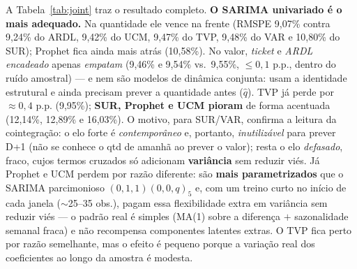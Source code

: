 \documentclass[11pt,a4paper]{article}
\begin{document}
A Tabela~\ref{tab:joint} traz o resultado completo. \textbf{O SARIMA univariado é o mais adequado.}
Na quantidade ele vence na frente (RMSPE 9,07\% contra 9,24\% do ARDL, 9,42\% do UCM, 9,47\% do TVP,
9,48\% do VAR e 10,80\% do SUR); Prophet fica ainda mais atrás (10,58\%). No valor, \emph{ticket} e
\emph{ARDL encadeado} apenas \emph{empatam} (9,46\% e 9,54\% vs.\ 9,55\%, $\le 0{,}1$ p.p.,
dentro do ruído amostral) --- e nem são modelos de dinâmica conjunta: usam a identidade estrutural e
ainda precisam prever a quantidade antes ($\hat q$). TVP já perde por $\approx 0{,}4$ p.p.
(9,95\%); \textbf{SUR, Prophet e UCM pioram} de forma acentuada (12,14\%, 12,89\% e 16,03\%). O
motivo, para SUR/VAR, confirma a leitura da cointegração: o elo forte é \emph{contemporâneo} e,
portanto, \emph{inutilizável} para prever D+1 (não se conhece o qtd de amanhã ao prever o valor);
resta o elo \emph{defasado}, fraco, cujos termos cruzados só adicionam \textbf{variância} sem
reduzir viés. Já Prophet e UCM perdem por razão diferente: são \textbf{mais parametrizados} que o
SARIMA parcimonioso $(0,1,1)(0,0,q)_5$ e, com um treino curto no início de cada janela
($\sim$25--35 obs.), pagam essa flexibilidade extra em variância sem reduzir viés --- o padrão real
é simples (MA(1) sobre a diferença $+$ sazonalidade semanal fraca) e não recompensa componentes
latentes extras. O TVP fica perto por razão semelhante, mas o efeito é pequeno porque a variação
real dos coeficientes ao longo da amostra é modesta.
\end{document}
